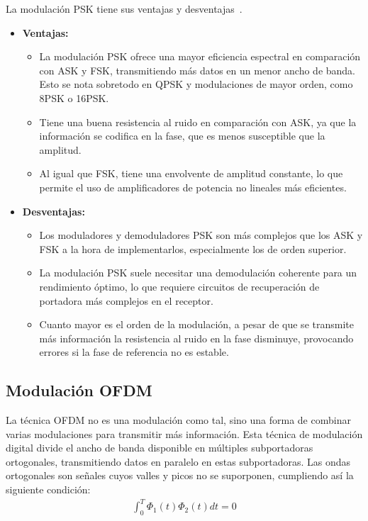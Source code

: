 \documentclass[12pt, letterpaper]{article}
\begin{document}
La modulación PSK tiene sus ventajas y desventajas~\cite{inproceedings}.
\begin{itemize}
    \item \textbf{Ventajas:}
    \begin{itemize}
        \item La modulación PSK ofrece una mayor eficiencia espectral en comparación con ASK y FSK, transmitiendo más datos en un menor ancho de banda. Esto se nota sobretodo en QPSK y modulaciones de mayor orden, como 8PSK o 16PSK.\@
        \item Tiene una buena resistencia al ruido en comparación con ASK, ya que la información se codifica en la fase, que es menos susceptible que la amplitud.
        \item Al igual que FSK, tiene una envolvente de amplitud constante, lo que permite el uso de amplificadores de potencia no lineales más eficientes.
    \end{itemize}

    \item \textbf{Desventajas:}
    \begin{itemize}
        \item Los moduladores y demoduladores PSK son más complejos que los ASK y FSK a la hora de implementarlos, especialmente los de orden superior.
        \item La modulación PSK suele necesitar una demodulación coherente para un rendimiento óptimo, lo que requiere circuitos de recuperación de portadora más complejos en el receptor.
        \item Cuanto mayor es el orden de la modulación, a pesar de que se transmite más información la resistencia al ruido en la fase disminuye, provocando errores si la fase de referencia no es estable.
    \end{itemize}
\end{itemize}

\subsection{Modulación OFDM}
La técnica OFDM no es una modulación como tal, sino una forma de combinar varias modulaciones para transmitir más información. Esta técnica de modulación digital divide el ancho de banda disponible en múltiples subportadoras ortogonales, transmitiendo datos en paralelo en estas subportadoras. Las ondas ortogonales son señales cuyos valles y picos no se suporponen, cumpliendo así la siguiente condición:
\begin{align}
    \int_{0}^{T} \Phi_1(t) \Phi_2(t) dt = 0
\end{align}
\end{document}
